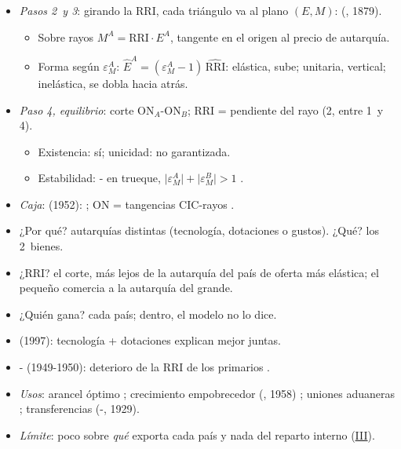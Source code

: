 \documentclass{article}
\begin{document}
\begin{columnas}
\begin{itemize}
\item \emph{Pasos 2~y 3}: girando la RRI, cada triángulo va al plano $(E,M)$:  (, 1879).
  \begin{itemize}
  \item Sobre rayos $M^A=\mathrm{RRI}\cdot E^A$, tangente en el origen al precio de autarquía.
  \item Forma según $\varepsilon^A_M$: $\hat E^A=(\varepsilon^A_M-1)\,\widehat{\mathrm{RRI}}$: elástica, sube; unitaria, vertical; inelástica, se dobla hacia atrás.
  \end{itemize}
\end{itemize}
\begin{itemize}
\item \emph{Paso 4, equilibrio}: corte ON$_A$-ON$_B$; RRI = pendiente del rayo (2, entre 1~y 4).
  \begin{itemize}
  \item Existencia: sí; unicidad: no garantizada.
  \item Estabilidad: - en trueque, $\lvert\varepsilon^A_M\rvert+\lvert\varepsilon^B_M\rvert>1$ .
  \end{itemize}
\end{itemize}
\begin{itemize}
\item \emph{Caja}:  (1952): ; ON = tangencias CIC-rayos .
\end{itemize}
\begin{itemize}
\item ¿Por qué? autarquías distintas (tecnología, dotaciones o gustos). ¿Qué? los 2~bienes.
\item ¿RRI? el corte, más lejos de la autarquía del país de oferta más elástica; el pequeño comercia a la autarquía del grande.
\item ¿Quién gana? cada país; dentro, el modelo no lo dice.
\end{itemize}
\begin{itemize}
\item {} (1997): tecnología + dotaciones explican mejor juntas.
\item {}- (1949-1950): deterioro de la RRI de los primarios  .
\item \emph{Usos}: arancel óptimo ; crecimiento empobrecedor (, 1958) ; uniones aduaneras ; transferencias (-, 1929).
\item \emph{Límite}: poco sobre \emph{qué} exporta cada país y nada del reparto interno (\hyperref[rep:III]{III}).
\end{itemize}


\end{columnas}
\end{document}
